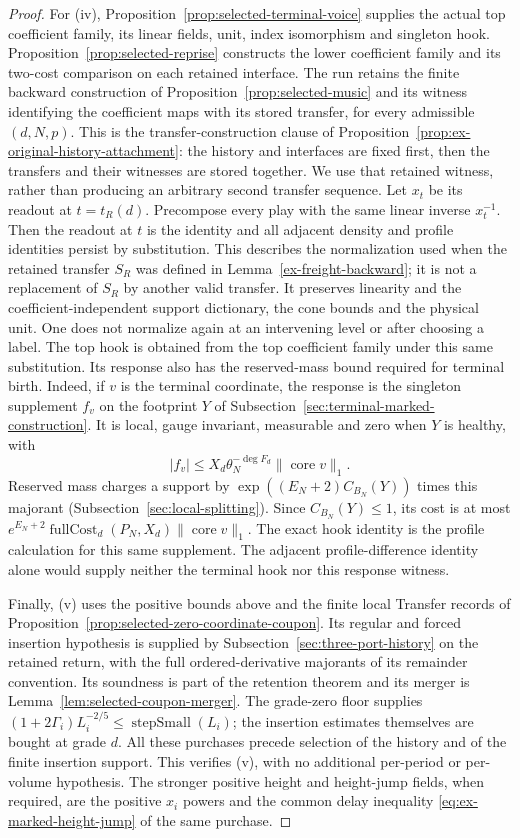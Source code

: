 \begin{proof}
For (iv), Proposition~\ref{prop:selected-terminal-voice} supplies the
actual top coefficient family, its linear fields, unit, index isomorphism and
singleton hook. Proposition~\ref{prop:selected-reprise} constructs the
lower coefficient family and its two-cost comparison on each retained interface.
The run retains the finite backward construction of
Proposition~\ref{prop:selected-music} and its witness identifying the
coefficient maps with its stored transfer, for every admissible $(d,N,p)$. This
is the transfer-construction clause of
Proposition~\ref{prop:ex-original-history-attachment}: the history and
interfaces are fixed first, then the transfers and their witnesses are
stored together. We use that retained witness, rather than producing
an arbitrary second transfer sequence. Let $x_t$ be its readout at
$t=t_R(d)$. Precompose every play with the same linear inverse
$x_t^{-1}$. Then the readout at $t$ is the identity and all adjacent
density and profile identities persist by substitution. This describes the normalization used when the retained
transfer $S_R$ was defined in Lemma~\ref{ex-freight-backward}; it is
not a replacement of $S_R$ by another valid transfer. It preserves linearity and the
coefficient-independent support dictionary, the cone bounds and the
physical unit. One does not normalize again at an intervening level
or after choosing a label. The top hook is obtained from the top
coefficient family under this same substitution. Its response also has the
reserved-mass bound required for terminal birth. Indeed, if $v$ is
the terminal coordinate, the response is the singleton supplement
$f_v$ on the footprint $Y$ of
Subsection~\ref{sec:terminal-marked-construction}. It is local,
gauge invariant, measurable and zero when $Y$ is healthy, with
\[
 |f_v|\le X_d\theta_N^{-\deg F_d}
                  \|\operatorname{core}v\|_1.
\]
Reserved mass charges a support by
$\exp((E_N+2)C_{B_N}(Y))$ times this majorant
(Subsection~\ref{sec:local-splitting}). Since $C_{B_N}(Y)\le1$, its
cost is at most
$e^{E_N+2}\operatorname{fullCost}_d(P_N,X_d)
\|\operatorname{core}v\|_1$.
The exact hook identity is the profile calculation for this same
supplement. The adjacent profile-difference identity alone would
supply neither the terminal hook nor this response witness.

Finally, (v) uses the positive bounds above and the finite local
Transfer records of Proposition~\ref{prop:selected-zero-coordinate-coupon}.
Its regular and forced insertion hypothesis is supplied by
Subsection~\ref{sec:three-port-history} on the retained return, with the
full ordered-derivative majorants of its remainder convention.
Its soundness is part of the retention theorem and its merger is
Lemma~\ref{lem:selected-coupon-merger}. The grade-zero floor supplies
$(1+2\Gamma_i)L_i^{-2/5}\le\operatorname{stepSmall}(L_i)$; the
insertion estimates themselves are bought at grade $d$. All these
purchases precede selection of the history and of the finite insertion support.
This verifies (v), with no additional per-period or per-volume
hypothesis. The stronger positive height and height-jump fields, when
required, are the positive $x_i$ powers and the common delay inequality
\eqref{eq:ex-marked-height-jump} of the same purchase.
\end{proof}

